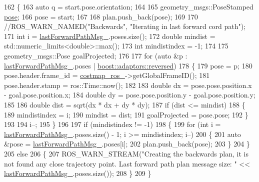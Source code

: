 \begin{DoxyCode}
162 \{
163     \textcolor{keyword}{auto} q = start.pose.orientation;
164 
165     geometry\_msgs::PoseStamped \hyperlink{namespaceinteractive__marker_a06e4691dc5f93e0da6dc9a6efa8d99b5}{pose};
166     pose = start;
167 
168     plan.push\_back(pose);
169 
170     \textcolor{comment}{//ROS\_WARN\_NAMED("Backwards", "Iterating in last forward cord path");}
171     \textcolor{keywordtype}{int} i = \hyperlink{classcl__move__base__z_1_1backward__global__planner_1_1BackwardGlobalPlanner_a149ee7d22d98271c9ee1da55241d500b}{lastForwardPathMsg\_}.poses.size();
172     \textcolor{keywordtype}{double} mindist = std::numeric\_limits<double>::max();
173     \textcolor{keywordtype}{int} mindistindex = -1;
174 
175     geometry\_msgs::Pose goalProjected;
176 
177     \textcolor{keywordflow}{for} (\textcolor{keyword}{auto} &p : \hyperlink{classcl__move__base__z_1_1backward__global__planner_1_1BackwardGlobalPlanner_a149ee7d22d98271c9ee1da55241d500b}{lastForwardPathMsg\_}.poses | 
      \hyperlink{namespacecpp_1_1ast_a0b1c00fd4aaa476b10de6b3a2550f39f}{boost::adaptors::reversed})
178     \{
179         pose = p;
180         pose.header.frame\_id = \hyperlink{classcl__move__base__z_1_1backward__global__planner_1_1BackwardGlobalPlanner_a7103c15e6540a514acd421c3c6e194a4}{costmap\_ros\_}->getGlobalFrameID();
181         pose.header.stamp = ros::Time::now();
182 
183         \textcolor{keywordtype}{double} dx = pose.pose.position.x - goal.pose.position.x;
184         \textcolor{keywordtype}{double} dy = pose.pose.position.y - goal.pose.position.y;
185 
186         \textcolor{keywordtype}{double} dist = sqrt(dx * dx + dy * dy);
187         \textcolor{keywordflow}{if} (dist <= mindist)
188         \{
189             mindistindex = i;
190             mindist = dist;
191             goalProjected = pose.pose;
192         \}
193 
194         i--;
195     \}
196 
197     \textcolor{keywordflow}{if} (mindistindex != -1)
198     \{
199         \textcolor{keywordflow}{for} (\textcolor{keywordtype}{int} i = \hyperlink{classcl__move__base__z_1_1backward__global__planner_1_1BackwardGlobalPlanner_a149ee7d22d98271c9ee1da55241d500b}{lastForwardPathMsg\_}.poses.size() - 1; i >= mindistindex; i--)
200         \{
201             \textcolor{keyword}{auto} &pose = \hyperlink{classcl__move__base__z_1_1backward__global__planner_1_1BackwardGlobalPlanner_a149ee7d22d98271c9ee1da55241d500b}{lastForwardPathMsg\_}.poses[i];
202             plan.push\_back(pose);
203         \}
204     \}
205     \textcolor{keywordflow}{else}
206     \{
207         ROS\_WARN\_STREAM(\textcolor{stringliteral}{"Creating the backwards plan, it is not found any close trajectory point. Last
       forward path plan message size: "} << \hyperlink{classcl__move__base__z_1_1backward__global__planner_1_1BackwardGlobalPlanner_a149ee7d22d98271c9ee1da55241d500b}{lastForwardPathMsg\_}.poses.size());
208     \}
209 \}
\end{DoxyCode}
